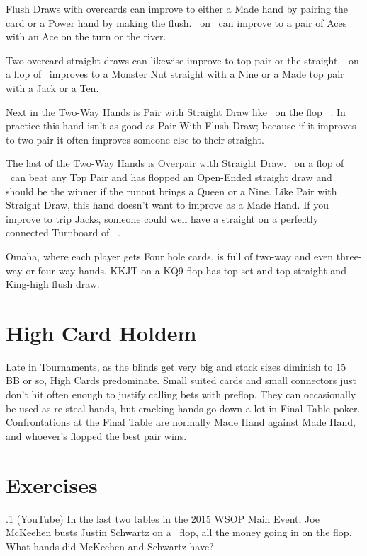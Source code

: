 Flush Draws with overcards can improve to either a Made hand by
pairing the card or a Power hand by making the flush. \Ad\sevd\ on
\Kc\nined\eigd\ can improve to a pair of Aces with an Ace on the turn
or the river.

Two overcard straight draws can likewise improve to top pair or the
straight. \Jh\tenc\ on a flop of \eigh\sevc\tres\ improves to a Monster
Nut straight with a Nine or a Made top pair with a Jack or a Ten.

Next in the Two-Way Hands is Pair with Straight Draw like
\tend\nined\ on the flop \tenc\eigh\sevs\ . In practice this hand
isn't as good as Pair With Flush Draw; because if it improves to two
pair it often improves someone else to their straight.

The last of the Two-Way Hands is Overpair with Straight
Draw. \Js\Jc\ on a flop of \tenc\nineh\eigs\ can beat any Top Pair
and has flopped an Open-Ended straight draw and should be the winner
if the runout brings a Queen or a Nine. Like Pair with Straight Draw,
this hand doesn't want to improve as a Made Hand. If you improve to
trip Jacks, someone could well have a straight on a perfectly
connected Turnboard of \tenc\nineh\eigs\Jh\ .

Omaha, where each player gets Four hole cards, is full of two-way
and even three-way or four-way hands. KKJT on a KQ9 flop has top
set and top straight and King-high flush draw.

\section{High Card Holdem}

Late in Tournaments, as the blinds get very big and stack sizes diminish
to 15 BB or so, High Cards predominate. Small suited cards and small
connectors just don't hit often enough to justify calling bets with
preflop. They can occasionally be used as re-steal hands, but cracking
hands go down a lot in Final Table poker. Confrontations at the Final
Table are normally Made Hand against Made Hand, and whoever's flopped
the best pair wins.

\section{Exercises}


.1 (YouTube) In the last two tables in the 2015 WSOP
Main Event, Joe McKeehen busts Justin Schwartz on a
\sixh\tred\twod\ flop, all the money going in on the flop. What hands
did McKeehen and Schwartz have?
